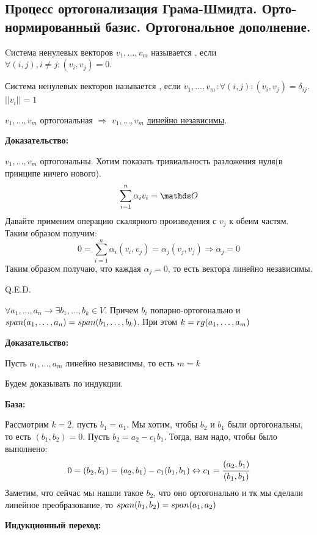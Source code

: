 \pagebreak
\subsection{Процесс ортогонализация Грама-Шмидта. Орто-нормированный базис. Ортогональное дополнение.}

 Cистема ненулевых векторов $v_1,\ldots, v_m$ называется , если $\forall (i,j), i\neq j: (v_i,v_j) =0$.  



 Система ненулевых векторов называется , если $v_1,\ldots, v_m: \forall (i,j): (v_i,v_j) = \delta_{ij}$. $||v_i||= 1$

 $v_1,\ldots, v_m$ ортогональная $\Rightarrow$ $v_1,\ldots , v_m$ \uline{линейно независимы}.

\textbf{Доказательство:}

$v_1,\ldots, v_m$ ортогональны. Хотим показать тривиальность разложения нуля(в принципе ничего нового).
$$\sum\limits_{i=1}^n \alpha_i v_i =\zero$$
Давайте применим операцию скалярного произведения с $v_j$ к обеим частям. Таким образом получим:
$$0 = \sum\limits_{i=1}^n \alpha_i (v_i,v_j)= \alpha_j (v_j,v_j) \Rightarrow \alpha_j =0$$ 
Таким образом получаю, что каждая $\alpha_j = 0$, то есть вектора линейно независимы.

\hfill Q.E.D.



$\forall a_1,\ldots,a_n \rightarrow \exists b_1,\ldots,b_k \in V$. Причем $b_i$ попарно-ортогонально и $span (a_1,\ldots, a_n) = span(b_1,\ldots,b_k)$. При этом $k = rg (a_1,\ldots,a_m)$

\textbf{Доказательство:}

Пусть $a_1,\ldots,a_m$ линейно независимы, то есть $m=k$

Будем доказывать по индукции.

\textbf{База:}

Рассмотрим $k=2$, пусть $b_1 = a_1$. Мы хотим, чтобы $b_2$ и $b_1$ были ортогональны, то есть $(b_1,b_2) = 0$. Пусть $b_2 = a_2 - c_1 b_1$. Тогда, нам надо, чтобы было выполнено:
$$0 = (b_2,b_1) = (a_2,b_1)-c_1(b_1,b_1) \Leftrightarrow c_1 = \cfrac{(a_2,b_1)}{(b_1,b_1)}$$
Заметим, что сейчас мы нашли такое $b_2$, что оно ортогонально и тк мы сделали линейное преобразование, то $span (b_1,b_2) = span (a_1,a_2)$

\textbf{Индукционный переход:}


